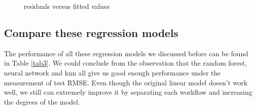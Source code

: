 \documentclass{article}
\begin{document}
\begin{figure}[!htbp]
\centering
{}
\caption{residuals versus fitted values} \label{1_kn2}
\end{figure}

\subsection{Compare these regression models}

The performance of all these regression models we discussed before can be found in Table \ref{tab3}. We could conclude from the observation that the random forest, neural network and knn all give us good enough performance under the measurement of test RMSE. Even though the original linear model doesn't work well, we still can extremely improve it by separating each workflow and increasing the degrees of the model.
\end{document}
